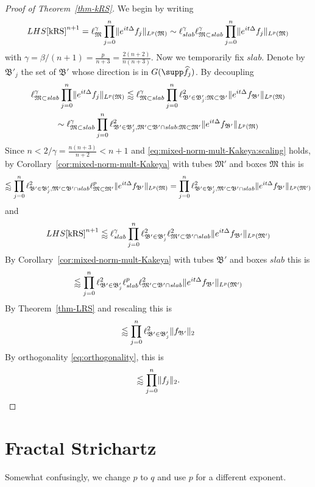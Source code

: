 \documentclass[biblatex]{pzorin-note}
\newcommand{\eit}{e^{i t \Delta}}
\newcommand{\bM}{\mathfrak{M}} %
\newcommand{\bBp}{\mathfrak{B}'} %
\newcommand{\bMp}{\mathfrak{M}'} %
\begin{document}
\begin{proof}[Proof of Theorem~\ref{thm-kRS}]
We begin by writing
\[
LHS\eqref{kRS}^{n+1}
=
\ell^{\gamma}_{\bM} \prod_{j=0}^{n} \norm{ \eit f_{j} }_{L^{p}(\bM)}
\sim
\ell^{\gamma}_{slab} \ell^{\gamma}_{\bM\subset slab} \prod_{j=0}^{n} \norm{ \eit f_{j} }_{L^{p}(\bM)}
\]
with $\gamma = \beta/(n+1) = \frac{p}{n+3} = \frac{2(n+2)}{n(n+3)}$.
Now we temporarily fix $slab$.
Denote by $\bBp_{j}$ the set of $\bBp$ whose direction is in $G(\supp \widehat{f_{j}})$.
By decoupling
\begin{multline*}
\ell^{\gamma}_{\bM\subset slab} \prod_{j=0}^{n} \norm{ \eit f_{j} }_{L^{p}(\bM)}
\lessapprox
\ell^{\gamma}_{\bM \subset slab} \prod_{j=0}^{n} \ell^{2}_{\bBp \in \bBp_{j} : \bM \subset \bBp} \norm{ \eit f_{\bBp} }_{L^{p}(\bM)}\\
\sim
\ell^{\gamma}_{\bM \subset slab} \prod_{j=0}^{n} \ell^{2}_{\bBp \in \bBp_{j}, \bMp \subset \bBp \cap slab : \bM \subset \bMp} \norm{ \eit f_{\bBp} }_{L^{p}(\bM)}
\end{multline*}
Since $n < 2/\gamma = \frac{n(n+3)}{n+2} < n+1$ and \eqref{eq:mixed-norm-mult-Kakeya:scaling} holds, by Corollary~\ref{cor:mixed-norm-mult-Kakeya} with tubes $\bMp$ and boxes $\bM$ this is
\[
\lessapprox
\prod_{j=0}^{n} \ell^{2}_{\bBp \in \bBp_{j}, \bMp \subset \bBp \cap slab} \ell^{p}_{\bM \subset \bMp} \norm{\eit f_{\bBp}}_{L^{p}(\bM)}
=
\prod_{j=0}^{n} \ell^{2}_{\bBp \in \bBp_{j}, \bMp \subset \bBp \cap slab} \norm{\eit f_{\bBp}}_{L^{p}(\bMp)}
\]
and
\[
LHS\eqref{kRS}^{n+1}
\lessapprox
\ell^{\gamma}_{slab}
\prod_{j=0}^{n} \ell^{2}_{\bBp \in \bBp_{j}} \ell^{2}_{\bMp \subset \bBp \cap slab} \norm{\eit f_{\bBp}}_{L^{p}(\bMp)}
\]
By Corollary~\ref{cor:mixed-norm-mult-Kakeya} with tubes $\bBp$ and boxes $slab$ this is
\[
\lessapprox
\prod_{j=0}^{n} \ell^{2}_{\bBp \in \bBp_{j}} \ell^{p}_{slab} \ell^{2}_{\bMp \subset \bBp \cap slab} \norm{\eit f_{\bBp}}_{L^{p}(\bMp)}
\]
By Theorem~\ref{thm-LRS} and rescaling this is
\[
\lessapprox
\prod_{j=0}^{n} \ell^{2}_{\bBp \in \bBp_{j}} \norm{f_{\bBp}}_{2}
\]
By orthogonality \eqref{eq:orthogonality}, this is
\[
\lessapprox
\prod_{j=0}^{n} \lVert f_{j}\rVert_{2}.
\]
\end{proof}


\section{Fractal Strichartz}
\label{sec-pf}
Somewhat confusingly, we change $p$ to $q$ and use $p$ for a different exponent.
\end{document}
